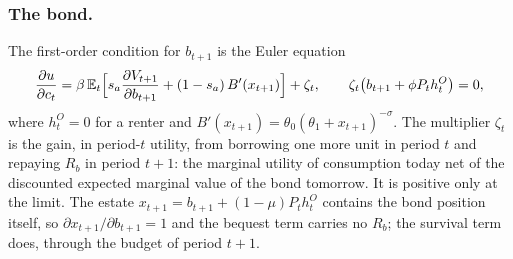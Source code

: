 \subsubsection*{The bond.}
The first-order condition for $b_{t+1}$ is the Euler equation
\begin{equation}
 \frac{\partial u}{\partial c_t}
 =\beta\,\mathbb E_t\Bigl[s_a\frac{\partial V_{t+1}}{\partial b_{t+1}}+(1-s_a)\,B'(x_{t+1})\Bigr]+\zeta_t,
 \qquad
 \zeta_t\bigl(b_{t+1}+\phi P_th^O_t\bigr)=0,
 \label{eq:app-euler}
\end{equation}
where $h^O_t=0$ for a renter and
$B'(x_{t+1})=\theta_0(\theta_1+x_{t+1})^{-\sigma}$. The multiplier $\zeta_t$
is the gain, in period-$t$ utility, from borrowing one more unit in period
$t$ and repaying $R_b$ in period $t+1$: the marginal utility of consumption
today net of the discounted expected marginal value of the bond tomorrow. It
is positive only at the limit. The estate $x_{t+1}=b_{t+1}+(1-\mu)P_th^O_t$
contains the bond position itself, so $\partial x_{t+1}/\partial b_{t+1}=1$
and the bequest term carries no $R_b$; the survival term does, through the
budget of period $t+1$.

